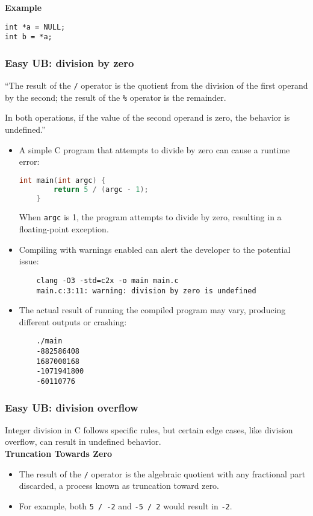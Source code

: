 \documentclass[12pt]{article}
\begin{document}
\textbf{Example}
\begin{lstlisting}
int *a = NULL;
int b = *a;
\end{lstlisting}

\subsubsection{Easy UB: division by zero}

``The result of the \texttt{/} operator is the quotient from the division of the first operand by the second;
the result of the \texttt{\%} operator is the remainder.

In both operations, if the value of the second operand is zero, the behavior is undefined.''

\begin{itemize}
    \item A simple C program that attempts to divide by zero can cause a runtime error:
    \begin{lstlisting}[language=C]
    int main(int argc) {
        return 5 / (argc - 1);
    }
    \end{lstlisting}
    When \texttt{argc} is 1, the program attempts to divide by zero, resulting in a floating-point exception.

    \item Compiling with warnings enabled can alert the developer to the potential issue:
    \begin{lstlisting}
    clang -O3 -std=c2x -o main main.c
    main.c:3:11: warning: division by zero is undefined
    \end{lstlisting}
    
    \item The actual result of running the compiled program may vary, producing different outputs or crashing:
    \begin{lstlisting}
    ./main
    -882586408
    1687000168
    -1071941800
    -60110776
    \end{lstlisting}
\end{itemize}

\subsubsection{Easy UB: division overflow}
Integer division in C follows specific rules, but certain edge cases, like division overflow, can result in undefined behavior.\\

\textbf{Truncation Towards Zero}
\begin{itemize}
    \item The result of the \texttt{/} operator is the algebraic quotient with any fractional part discarded, a process known as truncation toward zero.
    \item For example, both \texttt{5 / -2} and \texttt{-5 / 2} would result in \texttt{-2}.
\end{itemize}
\end{document}
